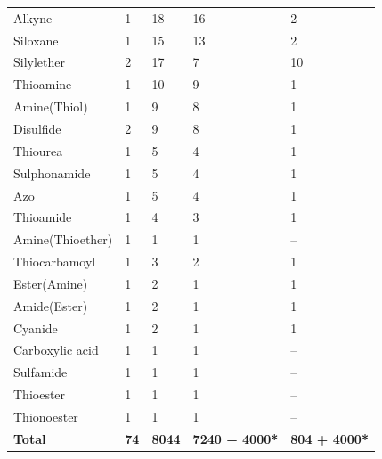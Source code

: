 \documentclass[11pt]{article}
\begin{document}
\begin{table}[htbp]
{\begin{tabular}{lllll}
Alkyne & 1 & 18 & 16 & 2 \\
Siloxane & 1 & 15 & 13 & 2 \\
Silylether & 2 & 17 & 7 & 10 \\
Thioamine & 1 & 10 & 9 & 1 \\
Amine(Thiol) & 1 & 9 & 8 & 1\\
Disulfide & 2 & 9 & 8 & 1 \\
Thiourea & 1 & 5 & 4 & 1 \\
Sulphonamide & 1 & 5 & 4 & 1 \\
Azo & 1 & 5 & 4 & 1 \\
Thioamide & 1 & 4 & 3 & 1 \\
Amine(Thioether) & 1 & 1 &  1 & -- \\
Thiocarbamoyl & 1 & 3 & 2 & 1  \\
Ester(Amine) & 1 & 2 & 1 & 1 \\
Amide(Ester) & 1 & 2 & 1 & 1 \\
Cyanide & 1 & 2 & 1 & 1 \\
Carboxylic acid & 1 & 1 & 1& -- \\
Sulfamide & 1 & 1 & 1 &-- \\
Thioester & 1 & 1 & 1 & -- \\
Thionoester & 1 & 1 & 1 & -- \\
\bottomrule
\textbf{Total}     & \textbf{74} & \textbf{8044} &\textbf{7240 + 4000*} &\textbf{804 + 4000*}  \\
\bottomrule
\end{tabular}
}
\end{table}
\end{document}
